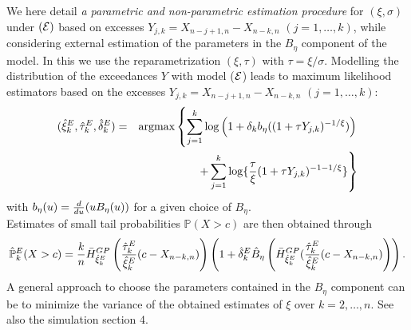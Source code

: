 \documentclass[twoside,leqno,11pt]{article}
\begin{document}
\noindent  
We here detail {\it a parametric and non-parametric estimation procedure} for $(\xi,\sigma)$ under $({\cal{E}})$ based on excesses $Y_{j,k}=X_{n-j+1,n}-X_{n-k,n}$ $(j=1,\ldots,k)$, while considering external estimation of the parameters in the $B_{\eta}$ component of the model. In this we use the reparametrization $(\xi,\tau)$ with $\tau=\xi/\sigma$.
Modelling the distribution of the exceedances $Y$ with model ($\cal{E}$) leads to maximum likelihood estimators based on the excesses $Y_{j,k}=X_{n-j+1,n}-X_{n-k,n}$ $(j=1,\ldots,k)$:  
\begin{eqnarray}
(\hat{\xi}^E_k,\hat{\tau}^E_k, \hat{\delta}^E_k)&=&
\mbox{argmax} \left\{
\sum_{j=1}^k \log\left( 
1+\delta_k b_{\eta}((1+\tau Y_{j,k})^{-1/\xi}) \right)
 \right. \nonumber \\
&& \hspace{1.5cm} \left. + \sum_{j=1}^k
\log \{{\tau \over \xi}(1+\tau Y_{j,k})^{-1-1/\xi} \}
 \right\}
 \label{MLE}
\end{eqnarray}
with $b_{\eta}(u) ={d \over du} (uB_{\eta}(u))$ for a given choice of $B_\eta$.\\
\noindent
Estimates of small tail probabilities $\mathbb{P}(X>c)$ are then  obtained through 
\[
\hat{\mathbb{P}}_k^E(X>c) = {k \over n} \bar{H}^{GP}_{\hat{\xi}^E_k}\left({\hat{\tau}^E_k \over \hat{\xi}^E_k}(c-X_{n-k,n}) \right) 
\left( 1+ \hat{\delta}_k^E \hat{B}_{\eta}\left(\bar{H}^{GP}_{\hat{\xi}^E_k} ({\hat{\tau}^E_k \over \hat{\xi}^E_k}(c-X_{n-k,n})\right)\right).
\]
A general approach to choose the parameters contained in the $B_{\eta}$ component can be to minimize the variance of the obtained estimates of $\xi$ over $k=2,\ldots,n$. See also the simulation section 4.
 
\end{document}
